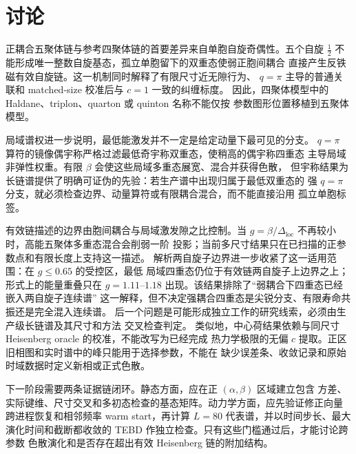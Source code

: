 \section{讨论}

正耦合五聚体链与参考四聚体链的首要差异来自单胞自旋奇偶性。五个自旋
$\frac12$ 不能形成唯一整数自旋基态，孤立单胞留下的双重态使弱正胞间耦合
直接产生反铁磁有效自旋链。这一机制同时解释了有限尺寸近无隙行为、
$q=\pi$ 主导的普通关联和 matched-size 校准后与 $c=1$ 一致的纠缠标度。
因此，四聚体模型中的 Haldane、triplon、quarton 或 quinton 名称不能仅按
参数图形位置移植到五聚体模型。

局域谱权进一步说明，最低能激发并不一定是给定动量下最可见的分支。
$q=\pi$ 算符的镜像偶宇称严格过滤最低奇宇称双重态，使稍高的偶宇称四重态
主导局域非弹性权重。有限 $\beta$ 会使这些局域多重态展宽、混合并获得色散，
但宇称结果为长链谱提供了明确可证伪的先验：若生产谱中出现归属于最低双重态的
强 $q=\pi$ 分支，就必须检查边界、动量算符或有限耦合混合，而不能直接沿用
孤立单胞标签。

有效链描述的边界由胞间耦合与局域激发隙之比控制。当
$g=\beta/\Delta_{\mathrm{loc}}$ 不再较小时，高能五聚体多重态混合会削弱一阶
投影；当前多尺寸结果只在已扫描的正参数点和有限长度上支持这一描述。
解析两自旋子边界进一步收紧了这一适用范围：在 $g\leq0.65$ 的受控区，最低
局域四重态仍位于有效链两自旋子上边界之上；形式上的能量重叠只在
$g=1.11$--$1.18$ 出现。该结果排除了“弱耦合下四重态已经嵌入两自旋子连续谱”
这一解释，但不决定强耦合四重态是尖锐分支、有限寿命共振还是完全混入连续谱。
后一个问题是可能形成独立工作的研究线索，必须由生产级长链谱及其尺寸和方法
交叉检查判定。
类似地，中心荷结果依赖与同尺寸 Heisenberg oracle 的校准，不能改写为已经完成
热力学极限的无偏 $c$ 提取。正区旧相图和实时谱中的峰只能用于选择参数，不能在
缺少误差条、收敛记录和原始时域数据时定义新相或正式色散。

下一阶段需要两条证据链闭环。静态方面，应在正 $(\alpha,\beta)$ 区域建立包含
方差、实际键维、尺寸交叉和多初态检查的基态矩阵。动力学方面，应先验证修正向量
跨进程恢复和相邻频率 warm start，再计算 $L=80$ 代表谱，并以时间步长、最大
演化时间和截断都收敛的 TEBD 作独立检查。只有这些门槛通过后，才能讨论跨参数
色散演化和是否存在超出有效 Heisenberg 链的附加结构。

